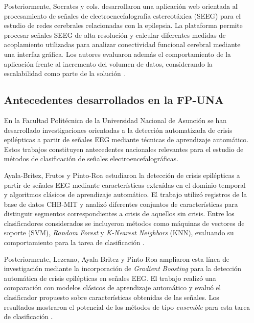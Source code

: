 Posteriormente, Socrates y cols. desarrollaron una aplicación web orientada al
procesamiento de señales de electroencefalografía estereotáxica (SEEG) para
el estudio de redes cerebrales relacionadas con la epilepsia. La plataforma
permite procesar señales SEEG de alta resolución y calcular diferentes
medidas de acoplamiento utilizadas para analizar conectividad funcional
cerebral mediante una interfaz gráfica. Los autores evaluaron además el
comportamiento de la aplicación frente al incremento del volumen de datos,
considerando la escalabilidad como parte de la solución
\citep{Socrates2019WebEEG}.

\subsection{Antecedentes desarrollados en la FP-UNA}
\label{subsec:antecedentes-fpuna}

En la Facultad Politécnica de la Universidad Nacional de Asunción se han
desarrollado investigaciones orientadas a la detección automatizada de crisis
epilépticas a partir de señales EEG mediante técnicas de aprendizaje
automático. Estos trabajos constituyen antecedentes nacionales relevantes
para el estudio de métodos de clasificación de señales electroencefalográficas.

Ayala-Britez, Frutos y Pinto-Roa estudiaron la detección de crisis epilépticas
a partir de señales EEG mediante características extraídas en el dominio
temporal y algoritmos clásicos de aprendizaje automático. El trabajo utilizó
registros de la base de datos CHB-MIT y analizó diferentes conjuntos de
características para distinguir segmentos correspondientes a crisis de aquellos
sin crisis. Entre los clasificadores considerados se incluyeron métodos como
máquinas de vectores de soporte (SVM), \textit{Random Forest} y
\textit{K-Nearest Neighbors} (KNN), evaluando su comportamiento
para la tarea de clasificación \citep{AyalaBritez2026SeizureDetection}.

Posteriormente, Lezcano, Ayala-Britez y Pinto-Roa ampliaron esta línea de
investigación mediante la incorporación de \textit{Gradient Boosting} para la detección automática de crisis epilépticas en señales EEG. El trabajo realizó una
comparación con modelos clásicos de aprendizaje automático y evaluó el
clasificador propuesto sobre características obtenidas de las señales. Los
resultados mostraron el potencial de los métodos de tipo \textit{ensemble}
para esta tarea de clasificación
\citep{Lezcano2026GradientBoosting}.

